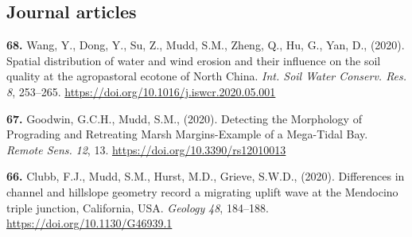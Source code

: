 \documentclass[10pt, a4paper]{article}
\newcommand{\years}[1]{\marginnote{\scriptsize #1}}
\begin{document}
\subsection*{Journal articles}

\years{2020}\hangindent=0.7cm\textbf{68. }Wang, Y., Dong, Y., Su, Z., Mudd, S.M., Zheng, Q., Hu, G., Yan, D., (2020). Spatial distribution of water and wind erosion and their influence on the soil quality at the agropastoral ecotone of North China. \textit{Int. Soil Water Conserv. Res.} \textit{8}, 253–265. \href{https://doi.org/10.1016/j.iswcr.2020.05.001}{https://doi.org/10.1016/j.iswcr.2020.05.001}\par
\years{2020}\hangindent=0.7cm\textbf{67. }Goodwin, G.C.H., Mudd, S.M., (2020). Detecting the Morphology of Prograding and Retreating Marsh Margins-Example of a Mega-Tidal Bay. \textit{Remote Sens.} \textit{12}, 13. \href{https://doi.org/10.3390/rs12010013}{https://doi.org/10.3390/rs12010013}\par
\years{2020}\hangindent=0.7cm\textbf{66. }Clubb, F.J., Mudd, S.M., Hurst, M.D., Grieve, S.W.D., (2020). Differences in channel and hillslope geometry record a migrating uplift wave at the Mendocino triple junction, California, USA. \textit{Geology} \textit{48}, 184–188. \href{https://doi.org/10.1130/G46939.1}{https://doi.org/10.1130/G46939.1}\par
\end{document}
